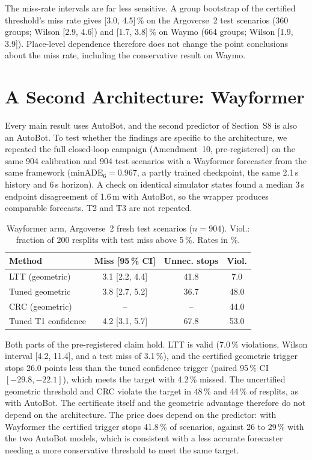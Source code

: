 \documentclass[lettersize,journal]{IEEEtran}
\begin{document}
The miss-rate intervals are far less sensitive. A group bootstrap of the
certified threshold's miss rate gives [3.0, 4.5]\,\% on the Argoverse~2
test scenarios (360 groups; Wilson [2.9, 4.6]) and [1.7, 3.8]\,\% on Waymo
(664 groups; Wilson [1.9, 3.9]). Place-level dependence therefore does not
change the point conclusions about the miss rate, including the
conservative result on Waymo.

\section{A Second Architecture: Wayformer}
\label{sec:s-wayformer}
Every main result uses AutoBot, and the second predictor of
Section~S8 is also an AutoBot. To test whether the findings are specific
to the architecture, we repeated the full closed-loop campaign
(Amendment~10, pre-registered) on the same 904 calibration and 904 test
scenarios with a Wayformer forecaster from the same framework (minADE$_6 =
0.967$, a partly trained checkpoint, the same 2.1\,s history and 6\,s
horizon). A check on identical simulator states found a median 3\,s
endpoint disagreement of 1.6\,m with AutoBot, so the wrapper produces
comparable forecasts. T2 and T3 are not repeated.

\begin{table}[h]
\caption{Wayformer arm, Argoverse~2 fresh test scenarios ($n = 904$). Viol.:
fraction of 200 resplits with test miss above 5\,\%. Rates in \%.}
\label{tab:way}
\centering
\scriptsize\setlength{\tabcolsep}{3pt}
\begin{tabular}{lccc}
\toprule
Method & Miss [95\,\% CI] & Unnec. stops & Viol. \\
\midrule
LTT (geometric) & 3.1 [2.2, 4.4] & 41.8 & 7.0 \\
Tuned geometric & 3.8 [2.7, 5.2] & 36.7 & 48.0 \\
CRC (geometric) & -- & -- & 44.0 \\
Tuned T1 confidence & 4.2 [3.1, 5.7] & 67.8 & 53.0 \\
\bottomrule
\end{tabular}
\end{table}

Both parts of the pre-registered claim hold. LTT is valid (7.0\,\%
violations, Wilson interval [4.2, 11.4], and a test miss of 3.1\,\%), and
the certified geometric trigger stops 26.0 points less than the tuned
confidence trigger (paired 95\,\% CI $[-29.8, -22.1]$), which meets the
target with 4.2\,\% missed. The uncertified geometric threshold and CRC
violate the target in 48\,\% and 44\,\% of resplits, as with AutoBot. The
certificate itself and the geometric advantage therefore do not depend on
the architecture. The price does depend on the predictor: with Wayformer
the certified trigger stops 41.8\,\% of scenarios, against 26 to 29\,\% with
the two AutoBot models, which is consistent with a less accurate forecaster
needing a more conservative threshold to meet the same target.
\end{document}
